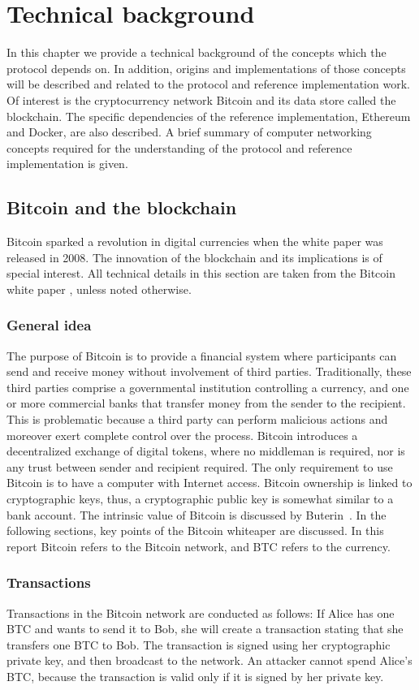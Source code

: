 \chapter{Technical background}
In this chapter we provide a technical background of the concepts which the protocol depends on. In addition, origins and implementations of those concepts will be described and related to the protocol and reference implementation work. Of interest is the cryptocurrency network Bitcoin and its data store called the blockchain. The specific dependencies of the reference implementation, Ethereum and Docker, are also described. A brief summary of computer networking concepts required for the understanding of the protocol and reference implementation is given.

\section{Bitcoin and the blockchain}
Bitcoin sparked a revolution in digital currencies when the white paper was released in 2008. The innovation of the blockchain and its implications is of special interest. All technical details in this section are taken from the Bitcoin white paper \cite{btc}, unless noted otherwise.

\subsection{General idea}
The purpose of Bitcoin is to provide a financial system where participants can send and receive money without involvement of third parties. Traditionally, these third parties comprise a governmental institution controlling a currency, and one or more commercial banks that transfer money from the sender to the recipient. This is problematic because a third party can perform malicious actions and moreover exert complete control over the process. Bitcoin introduces a decentralized exchange of digital tokens, where no middleman is required, nor is any trust between sender and recipient required. The only requirement to use Bitcoin is to have a computer with Internet access. Bitcoin ownership is linked to cryptographic keys, thus, a cryptographic public key is somewhat similar to a bank account. The intrinsic value of Bitcoin is discussed by Buterin~\cite{buterin:2011}. In the following sections, key points of the Bitcoin whiteaper are discussed. In this report Bitcoin refers to the Bitcoin network, and BTC refers to the currency.

\subsection{Transactions}
Transactions in the Bitcoin network are conducted as follows: If Alice has one BTC and wants to send it to Bob, she will create a transaction stating that she transfers one BTC to Bob. The transaction is signed using her cryptographic private key, and then broadcast to the network. An attacker cannot spend Alice's BTC, because the transaction is valid only if it is signed by her private key.

